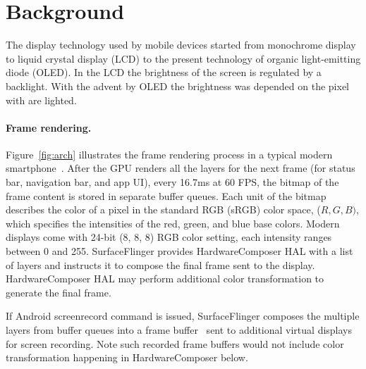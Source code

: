 \section{Background}
\label{sec:back}

The display technology used by mobile devices started from monochrome display
to liquid crystal display (LCD) to the present technology of organic
light-emitting diode (OLED).
In the LCD the brightness of the screen is regulated by a backlight. With the
advent by OLED the brightness was depended on the pixel with are lighted.
\fi

\paragraph{Frame rendering.}
Figure~\ref{fig:arch} illustrates the frame rendering process in a
typical modern smartphone~\cite{arch_graphicspipeline}.
After the GPU renders all the layers for the next frame
(for status bar, navigation bar, and app UI),
\eg every 16.7ms at 60 FPS, 
the bitmap of the frame content is stored in separate buffer queues.
%
Each unit of the bitmap describes the color of
a pixel in the standard RGB (sRGB) color space, ($R, G,
B)$, which specifies the intensities of the red, green, and blue base
colors.  Modern displays come with 24-bit (8, 8, 8) RGB color setting,
\ie each intensity ranges between 0 and 255.
%
SurfaceFlinger provides HardwareComposer HAL with a list of layers and
instructs it to compose the final frame sent to the display.
HardwareComposer HAL may perform additional color transformation to
generate the final frame.

If Android screenrecord command is issued, SurfaceFlinger composes
the multiple layers from buffer queues into a frame
buffer~\cite{arch_surfaceflinger} sent to additional virtual
displays for screen recording. Note such recorded frame buffers would not
include color transformation happening in HardwareComposer below.

